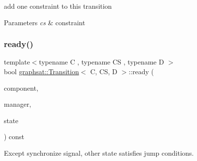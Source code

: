 add one constraint to this transition


\begin{DoxyParams}{Parameters}
{\em cs} & constraint \\
\hline
\end{DoxyParams}
\mbox{\label{classgraphsat_1_1_transition_a7ec1d0635ddfce028810457db91c3059}} 
\subsubsection{\texorpdfstring{ready()}{ready()}}
{\footnotesize\ttfamily template$<$typename C , typename CS , typename D $>$ \\
bool \mbox{\hyperlink{classgraphsat_1_1_transition}{graphsat\+::\+Transition}}$<$ C, CS, D $>$\+::ready (\begin{DoxyParamCaption}\item[{const int}]{component,  }\item[{const \mbox{\hyperlink{classgraphsat_1_1_state_manager}{State\+Manager}}$<$ C $>$ \&}]{manager,  }\item[{const C $\ast$const}]{state }\end{DoxyParamCaption}) const\hspace{0.3cm}{\ttfamily [inline]}}



Except synchronize signal, other state satisfies jump conditions. 


